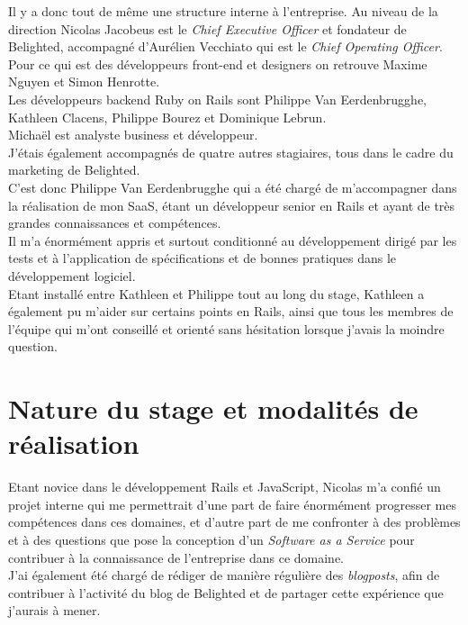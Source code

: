 \documentclass{report}
\begin{document}
  Il y a donc tout de même une structure interne à l'entreprise. Au niveau de la direction Nicolas Jacobeus est le \textit{Chief Executive Officer} et fondateur de Belighted, accompagné
  d'Aurélien Vecchiato qui est le \textit{Chief Operating Officer}.\\
  Pour ce qui est des développeurs front-end et designers on retrouve Maxime Nguyen et Simon Henrotte. \\
  Les développeurs backend Ruby on Rails sont Philippe Van Eerdenbrugghe, Kathleen Clacens, Philippe Bourez et Dominique Lebrun.\\
  Michaël est analyste business et développeur.\\
  J'étais également accompagnés de quatre autres stagiaires, tous dans le cadre du marketing de Belighted.\\ 

  C'est donc Philippe Van Eerdenbrugghe qui a été chargé de m'accompagner dans la réalisation de mon SaaS, étant un développeur senior en Rails et ayant de très grandes connaissances et compétences.\\
  Il m'a énormément appris et surtout conditionné au développement dirigé par les tests et à l'application de spécifications et de bonnes pratiques dans le développement logiciel.\\

  Etant installé entre Kathleen et Philippe tout au long du stage, Kathleen a également pu m'aider sur certains points en Rails, ainsi que tous les membres de l'équipe qui m'ont conseillé et orienté sans
  hésitation lorsque j'avais la moindre question.\\


\chapter{Nature du stage et modalités de réalisation}

  Etant novice dans le développement Rails et JavaScript, Nicolas m'a confié un projet interne qui me permettrait d'une part de faire énormément progresser mes compétences dans ces domaines, et
  d'autre part de me confronter à des problèmes et à des questions que pose la conception d'un \textit{Software as a Service} pour contribuer à la connaissance de l'entreprise dans ce domaine.\\
  J'ai également été chargé de rédiger de manière régulière des \textit{blogposts}, afin de contribuer à l'activité du blog de Belighted et de partager cette expérience que j'aurais à mener.
\end{document}
